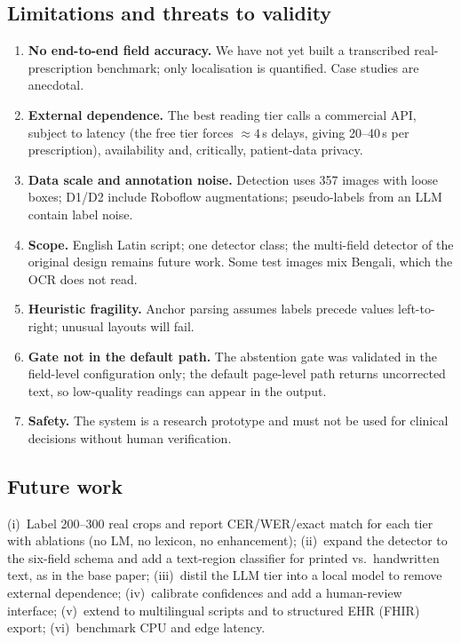 \documentclass[journal]{IEEEtran}
\begin{document}
\subsection{Limitations and threats to validity}
\begin{enumerate}
  \item \textbf{No end-to-end field accuracy.} We have not yet built a transcribed real-prescription benchmark; only localisation is quantified. Case studies are anecdotal.
  \item \textbf{External dependence.} The best reading tier calls a commercial API, subject to latency (the free tier forces $\approx4$\,s delays, giving 20--40\,s per prescription), availability and, critically, patient-data privacy.
  \item \textbf{Data scale and annotation noise.} Detection uses 357 images with loose boxes; D1/D2 include Roboflow augmentations; pseudo-labels from an LLM contain label noise.
  \item \textbf{Scope.} English Latin script; one detector class; the multi-field detector of the original design remains future work. Some test images mix Bengali, which the OCR does not read.
  \item \textbf{Heuristic fragility.} Anchor parsing assumes labels precede values left-to-right; unusual layouts will fail.
  \item \textbf{Gate not in the default path.} The abstention gate was validated in the field-level configuration only; the default page-level path returns uncorrected text, so low-quality readings can appear in the output.
  \item \textbf{Safety.} The system is a research prototype and must not be used for clinical decisions without human verification.
\end{enumerate}

\subsection{Future work}
(i)~Label 200--300 real crops and report CER/WER/exact match for each tier with ablations (no LM, no lexicon, no enhancement); (ii)~expand the detector to the six-field schema and add a text-region classifier for printed vs.\ handwritten text, as in the base paper; (iii)~distil the LLM tier into a local model to remove external dependence; (iv)~calibrate confidences and add a human-review interface; (v)~extend to multilingual scripts and to structured EHR (FHIR) export; (vi)~benchmark CPU and edge latency.
\end{document}
